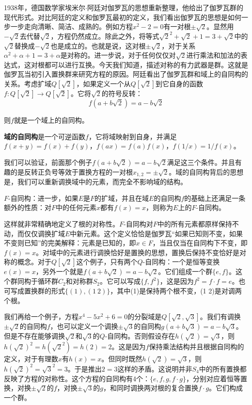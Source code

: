 \documentclass[b5paper]{ctexart}
\begin{document}
1938年，德国数学家埃米尔$\cdot$阿廷对伽罗瓦的思想重新整理，他给出了伽罗瓦群的现代形式。对比阿廷的定义和伽罗瓦最初的定义，我们看出伽罗瓦的思想是如何一步一步走向清晰、简洁、成熟的。例如方程$x^2 - 2 = 0$有一对根$\pm \sqrt{2}$。显然用$-\sqrt{2}$去代替$\sqrt{2}$，方程仍然成立。除此之外，将等式$\sqrt{2}^2 + \sqrt{2} + 1 = 3 + \sqrt{2}$中的$\sqrt{2}$替换成$-\sqrt{2}$也是成立的。也就是说，这对根$\pm \sqrt{2}$，对于关系$\alpha^2 + \alpha + 1 = 3 + \alpha$是对称的。进一步说，对于任何仅仅对$\sqrt{2}$进行乘法和加法的表达式，这对根都可以进行互换。今天我们知道，描述对称的有力武器是群。这就是伽罗瓦当初引入置换群来研究方程的原因。阿廷看出了伽罗瓦群和域上的自同构的关系。考虑扩域$Q[\sqrt{2}]$，如果定义一个从$Q[\sqrt{2}]$到它自身的函数$f: Q[\sqrt{2}] \to Q[\sqrt{2}]$。它将$\sqrt{2}$的符号反转：
\[
f(a + b \sqrt{2}) = a - b \sqrt{2}
\]

则$f$就是一个域上的自同构。

\begin{definition}
\textbf{域的自同构}是一个可逆函数$f$，它将域映射到自身，并满足$f(x + y) = f(x) + f(y)$，$f(ax) = f(a) f(x)$，$f(1/x) = 1/f(x)$。
\end{definition}

我们可以验证，前面那个例子$f(a + b \sqrt{2}) = a - b \sqrt{2}$满足这三个条件。并且有趣的是反转正负号等效于置换方程的一对根$x_{1,2} = \pm \sqrt{2}$。域的自同构背后的思想是，我们可以重新调换域中的元素，而完全不影响域的结构。

\begin{definition}
$F$-自同构：进一步，如果$E$是$F$的扩域，并且在域$E$的自同构$f$的基础上还满足一条额外的性质：对$F$中的任何元素$x$都有$f(x) = x$，则称为$E$上的$F$-自同构。
\end{definition}

这样就非常精确地定义了根的对称性。$F$-自同构对$F$中的所有元素都原样保持不动，而仅仅调换扩域$E$中新元素。这个定义恰恰是伽罗瓦“如果已知则不变，如果不变则已知”的完美解释：元素是已知的，即$x \in F$，当且仅当在自同构下不变，即$f(x) = x$。对域中的元素进行调换恰好是置换的思想，置换后保持不变恰好是对称的概念。对于$Q[\sqrt{2}]$这个例子，只有两个$Q$-自同构：一个是恒等变换$e(x) = x$，另外一个就是$f(a + b\sqrt{2}) = a - b\sqrt{2}$。它们组成一个群$\{e, f\}$。这个群同构于循环群$C_2$和对称群$S_2$。它可以写成$\{f, f^2\}$，这是因为$f^2 = f \cdot f = e$。也可写成置换群的形式$\{(1), (1\ 2)\}$，其中(1)是保持两个根不变，(1 2)是对调两个根。

我们再给一个例子，方程$x^4 - 5x^2 + 6 = 0$的分裂域是$Q[\sqrt{2}, \sqrt{3}]$。我们有调换$\pm \sqrt{2}$的自同构$f$，也可以定义一个调换$\pm \sqrt{3}$的自同构$g(a + b\sqrt{3}) = a - b\sqrt{3}$。但是不存在能够调换$\sqrt{2}$和$\sqrt{3}$的$Q$-自同构。否则假设存在$h(\sqrt{2}) = \sqrt{3}$，则$h(\sqrt{2})^2 = h(\sqrt{2}^2) = h(2) = 2$。这是因为$f$保持乘法结构并且根据自同构的定义，对于有理数$x$有$h(x) = x$。但同时既然$h(\sqrt{2}) = \sqrt{3}$，则$h(\sqrt{2})^2 = \sqrt{3}^2 = 3$。于是推出$2 = 3$这样的矛盾。这说明并非$S_4$中的所有置换都反映了方程的对称性。这个方程的自同构有4个：$\{e, f, g, f \cdot g\}$，分别对应着恒等置换，对换$\pm \sqrt{2}$的$f$，对换$\pm \sqrt{3}$的$g$，和同时调换两对根的复合置换$f \cdot g$。它们构成一个群。
\end{document}
